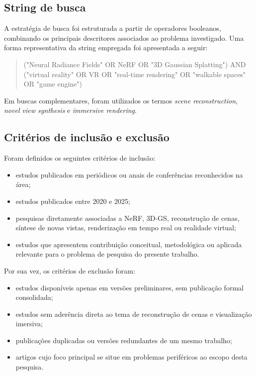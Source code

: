\subsection{String de busca}

A estratégia de busca foi estruturada a partir de operadores booleanos,
combinando os principais descritores associados ao problema investigado. Uma
forma representativa da string empregada foi apresentada a seguir:

\begingroup
{}
\begin{quote}
\ttfamily\raggedright
("Neural Radiance Fields" OR NeRF OR "3D Gaussian Splatting") AND ("virtual reality" OR VR OR "real-time rendering" OR "walkable spaces" OR "game engine")
\end{quote}
\endgroup

Em buscas complementares, foram utilizados os termos \textit{scene reconstruction}, \textit{novel view synthesis} e \textit{immersive rendering}.

\subsection{Critérios de inclusão e exclusão}

Foram definidos os seguintes critérios de inclusão:

\begin{itemize}
    \item estudos publicados em periódicos ou anais de conferências reconhecidos na área;
    \item estudos publicados entre 2020 e 2025;
    \item pesquisas diretamente associadas a NeRF, 3D-GS, reconstrução de cenas, síntese de novas vistas, renderização em tempo real ou realidade virtual;
    \item estudos que apresentem contribuição conceitual, metodológica ou aplicada relevante para o problema de pesquisa do presente trabalho.
\end{itemize}

Por sua vez, os critérios de exclusão foram:

\begin{itemize}
    \item estudos disponíveis apenas em versões preliminares, sem publicação formal consolidada;
    \item estudos sem aderência direta ao tema de reconstrução de cenas e visualização imersiva;
    \item publicações duplicadas ou versões redundantes de um mesmo trabalho;
    \item artigos cujo foco principal se situe em problemas periféricos ao escopo desta pesquisa.
\end{itemize}

